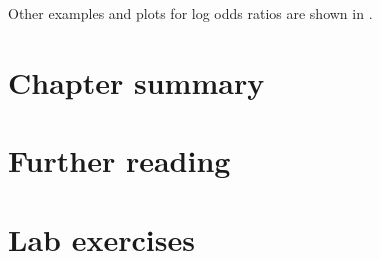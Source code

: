 \documentclass[10pt,krantz2]{krantz}\usepackage[]{graphicx}\usepackage[]{color}
\begin{document}
Other examples and plots for log odds ratios are shown in .


\section{Chapter summary}\label{sec:mosaic-summary}


\section{Further reading}\label{sec:mosaic-reading}

\section{Lab exercises}\label{sec:mosaic-lab}
\end{document}
